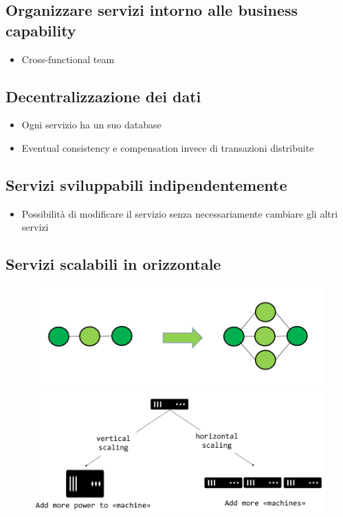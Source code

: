 \documentclass[a4paper, 12pt]{report}
\begin{document}
          \subsection{Organizzare servizi intorno alle business capability}
            \begin{itemize}
              \item Cross-functional team
            \end{itemize}
          \subsection{Decentralizzazione dei dati}
          \begin{itemize}
            \item Ogni servizio ha un suo database
            \item Eventual consistency e compensation invece di transazioni distribuite
          \end{itemize}
          \subsection{Servizi sviluppabili indipendentemente}
          \begin{itemize}
            \item Possibilità di modificare il servizio senza necessariamente cambiare gli altri servizi
          \end{itemize}
          \subsection{Servizi scalabili in orizzontale}
          \begin{figure}[htbp]
            \centering
            \includegraphics[scale=0.3]{Immagini/HScaling.png}
            \includegraphics[scale=0.3]{Immagini/HVScaling.png}
          \end{figure}
\end{document}
